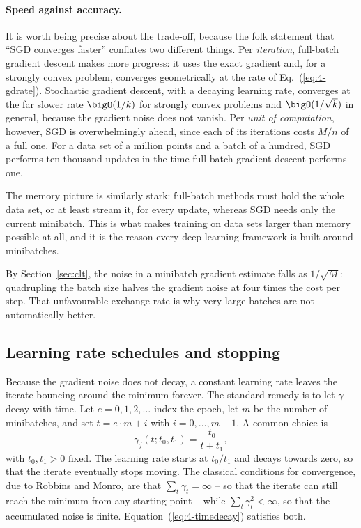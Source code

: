 \paragraph{Speed against accuracy.}
It is worth being precise about the trade-off, because the folk statement that
``SGD converges faster'' conflates two different things.  Per \emph{iteration},
full-batch gradient descent makes more progress: it uses the exact gradient
and, for a strongly convex problem, converges geometrically at the rate of
Eq.~(\ref{eq:4-gdrate}).  Stochastic gradient descent, with a decaying
learning rate, converges at the far slower rate $\bigO(1/k)$ for strongly
convex problems and $\bigO(1/\sqrt{k})$ in general, because the gradient noise
does not vanish.  Per \emph{unit of computation}, however, SGD is
overwhelmingly ahead, since each of its iterations costs $M/n$ of a full one.
For a data set of a million points and a batch of a hundred, SGD performs ten
thousand updates in the time full-batch gradient descent performs one.

The memory picture is similarly stark: full-batch methods must hold the whole
data set, or at least stream it, for every update, whereas SGD needs only the
current minibatch.  This is what makes training on data sets larger than
memory possible at all, and it is the reason every deep learning framework is
built around minibatches.

By Section~\ref{sec:clt}, the noise in a minibatch gradient estimate falls as
$1/\sqrt{M}$: quadrupling the batch size halves the gradient noise at four
times the cost per step.  That unfavourable exchange rate is why very large
batches are not automatically better.

\subsection{Learning rate schedules and stopping}
\label{sec:schedules}

Because the gradient noise does not decay, a constant learning rate leaves the
iterate bouncing around the minimum forever.  The standard remedy is to let
$\gamma$ decay with time.  Let $e=0,1,2,\dots$ index the epoch, let $m$ be the
number of minibatches, and set $t=e\cdot m+i$ with $i=0,\dots,m-1$.  A common
choice is
\begin{equation}
  \gamma_j(t;t_0,t_1) = \frac{t_0}{t+t_1},
  \label{eq:4-timedecay}
\end{equation}
with $t_0,t_1>0$ fixed.  The learning rate starts at $t_0/t_1$ and decays
towards zero, so that the iterate eventually stops moving.  The classical
conditions for convergence, due to Robbins and Monro, are that
$\sum_t\gamma_t=\infty$ -- so that the iterate can still reach the minimum from
any starting point -- while $\sum_t\gamma_t^{2}<\infty$, so that the accumulated
noise is finite.  Equation~(\ref{eq:4-timedecay}) satisfies both.

